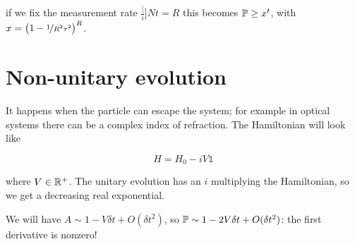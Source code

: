 \documentclass[main.tex]{subfiles}
\begin{document}
if we fix the measurement rate \(\frac[i]{N}{t} = R\) this becomes \(\P \geq x^t\), with \(x = \qty(1 - \frac[i]{1}{R^2\tau^2})^R\).

\section{Non-unitary evolution}

It happens when the particle can escape the system; for example in optical systems there can be a complex index of refraction. The Hamiltonian will look like

\begin{equation}
    H = H_0 - iV \mathbb 1
\end{equation}

where \(V \in \R^+\). The unitary evolution has an \(i\) multiplying the Hamiltonian, so we get a decreasing real exponential.

We will have \(A \sim 1 -V \delta t + O(\delta t^2)\), so \(\P  \sim 1 - 2V \delta t + O(\delta t^2)\): the first derivative is nonzero!
\end{document}
